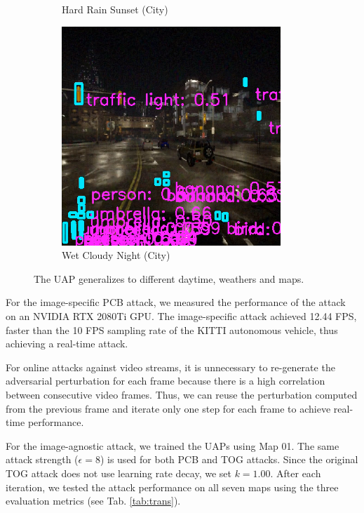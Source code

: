 \begin{figure}[H]
\begin{subfigure}[b]{0.48\textwidth}
        \caption{Hard Rain Sunset (City)}
        \label{fig:hard_rain} 
    \end{subfigure}
    \begin{subfigure}[b]{0.48\textwidth}
        \centering
        \includegraphics[width=\textwidth]{figures/chapter_detection/hardware/wet_cloudy_city.png}
        \caption{Wet Cloudy Night (City)}
        \label{fig:wet_cloudy}
    \end{subfigure}
  \caption{The UAP generalizes to different daytime, weathers and maps.}
  \label{fig:carla}
\end{figure}


For the image-specific PCB attack, we measured the performance of the attack on an NVIDIA RTX 2080Ti GPU. The image-specific attack achieved 12.44 FPS, faster than the 10 FPS sampling rate of the KITTI autonomous vehicle, thus achieving a real-time attack.

For online attacks against video streams, it is unnecessary to re-generate the adversarial perturbation for each frame because there is a high correlation between consecutive video frames. Thus, we can reuse the perturbation computed from the previous frame and iterate only one step for each frame to achieve real-time performance. 


For the image-agnostic attack, we trained the UAPs using Map 01. The same attack strength ($\epsilon=8$) is used for both PCB and TOG attacks. Since the original TOG attack does not use learning rate decay, we set $k=1.00$. After each iteration, we tested the attack performance on all seven maps using the three evaluation metrics (see Tab. \ref{tab:trans}).


